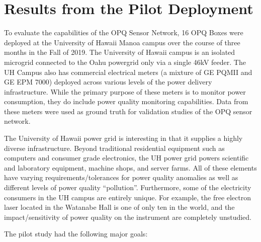 \section{Results from the Pilot Deployment}
\label{sec:pilot-study}

To evaluate the capabilities of the OPQ Sensor Network, 16 OPQ Boxes were deployed at the University of Hawaii Manoa campus over the course of three months in the Fall of 2019.  The University of Hawaii campus is an isolated microgrid connected to the Oahu powergrid only via a single 46kV feeder. The UH Campus also has commercial electrical meters (a mixture of GE PQMII and GE EPM 7000) deployed across various levels of the power delivery infrastructure. While the primary purpose of these meters is to monitor power consumption, they do include power quality monitoring capabilities. Data from these meters were used as ground truth for validation studies of the OPQ sensor network.

The University of Hawaii power grid is interesting in that it supplies a highly diverse infrastructure. Beyond traditional residential equipment such as computers and consumer grade electronics, the UH power grid powers scientific and laboratory equipment, machine shops, and server farms. All of these elements have varying requirements/tolerances for power quality anomalies as well as different levels of power quality “pollution”. Furthermore, some of the electricity consumers in the UH campus are entirely unique. For example, the free electron laser located in the Watanabe Hall is one of only ten in the world, and the impact/sensitivity of power quality on the instrument are completely unstudied.

The pilot study had the following major goals:

